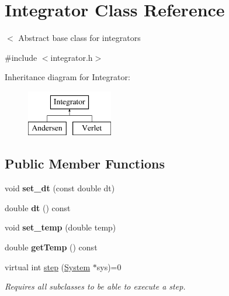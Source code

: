 \hypertarget{classIntegrator}{\section{Integrator Class Reference}
\label{classIntegrator}
}


$<$ Abstract base class for integrators  




{\ttfamily \#include $<$integrator.\-h$>$}

Inheritance diagram for Integrator\-:\begin{figure}[H]
\begin{center}
\leavevmode
\includegraphics[height=2.000000cm]{classIntegrator}
\end{center}
\end{figure}
\subsection*{Public Member Functions}
\begin{DoxyCompactItemize}
\item 
\hypertarget{classIntegrator_ae8a6ce5dbc5a6bf468fb151a9f9c79f1}{void {\bfseries set\-\_\-dt} (const double dt)}\label{classIntegrator_ae8a6ce5dbc5a6bf468fb151a9f9c79f1}

\item 
\hypertarget{classIntegrator_a63fb8d0a5c43c9c5cb609a39728fdb27}{double {\bfseries dt} () const }\label{classIntegrator_a63fb8d0a5c43c9c5cb609a39728fdb27}

\item 
\hypertarget{classIntegrator_a46707a9735b94ffcb503709fb595fe9a}{void {\bfseries set\-\_\-temp} (double temp)}\label{classIntegrator_a46707a9735b94ffcb503709fb595fe9a}

\item 
\hypertarget{classIntegrator_a0494a27296817ff78ce6614f2f5ad50e}{double {\bfseries get\-Temp} () const }\label{classIntegrator_a0494a27296817ff78ce6614f2f5ad50e}

\item 
\hypertarget{classIntegrator_aac53df432f961f8661e157b2a86d8b31}{virtual int \hyperlink{classIntegrator_aac53df432f961f8661e157b2a86d8b31}{step} (\hyperlink{classSystem}{System} $\ast$sys)=0}\label{classIntegrator_aac53df432f961f8661e157b2a86d8b31}

\begin{DoxyCompactList}\small\item\em Requires all subclasses to be able to execute a step. \end{DoxyCompactList}\end{DoxyCompactItemize}
